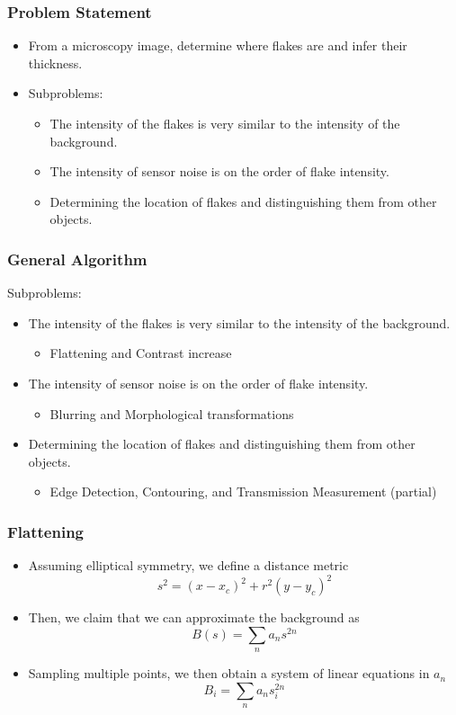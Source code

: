 \documentclass{beamer}
\title{}
\author{Charles Yang}
\date{7 January 2021}
\begin{document}
\frame{\titlepage}

\begin{frame}
	\frametitle{Problem Statement}
	\begin{itemize}
		\item<1-> From a microscopy image, determine where flakes are and infer their thickness. 
		\item<2-> Subproblems:
		\begin{itemize}
			\item<2-> The intensity of the flakes is very similar to the intensity of the background.
			\item<3-> The intensity of sensor noise is on the order of flake intensity.
			\item<4-> Determining the location of flakes and distinguishing them from other objects.
		\end{itemize}
	\end{itemize}
\end{frame}

\begin{frame}
	\frametitle{General Algorithm}
		Subproblems:
		\begin{itemize}
			\item<1-> The intensity of the flakes is very similar to the intensity of the background.
				\begin{itemize}
					\item<2-> Flattening and Contrast increase
				\end{itemize}
			\item<1-> The intensity of sensor noise is on the order of flake intensity.
				\begin{itemize}
					\item<3-> Blurring and Morphological transformations
				\end{itemize}
			\item<1-> Determining the location of flakes and distinguishing them from other objects.
				\begin{itemize}
					\item<4-> Edge Detection, Contouring, and Transmission Measurement (partial)
				\end{itemize}
		\end{itemize}
\end{frame}

\begin{frame}
	\frametitle{Flattening}
	\begin{itemize}
		\item<1-> Assuming elliptical symmetry, we define a distance metric 
			\[s^2 = (x-x_c)^2+r^2(y-y_c)^2\]
		\item<2-> Then, we claim that we can approximate the background as
			\[B(s) = \sum_n a_n s^{2n}\]
		\item<3-> Sampling multiple points, we then obtain a system of linear equations in \(a_n\)
			\[B_i = \sum_n a_n s_i^{2n}\]
	\end{itemize}
\end{frame}
\end{document}
